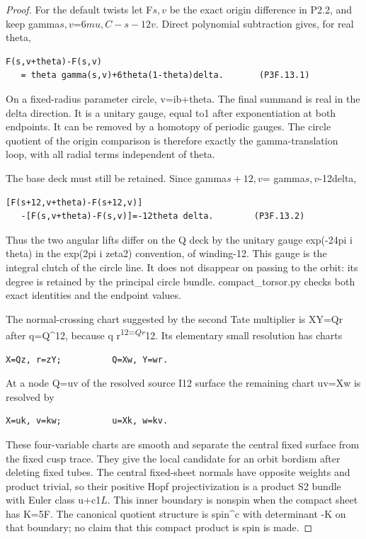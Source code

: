 \begin{proof}
For the default twists let F\(s,v\) be the exact origin difference in P2.2, and keep gamma\(s,v\)=\(6mu,C-s-12v\). Direct polynomial subtraction gives, for real theta,

\begin{lstlisting}
F(s,v+theta)-F(s,v)
   = theta gamma(s,v)+6theta(1-theta)delta.       (P3F.13.1)
\end{lstlisting}

On a fixed-radius parameter circle, v=ib+theta. The final summand is real in the delta direction. It is a unitary gauge, equal to1 after exponentiation at both endpoints. It can be removed by a homotopy of periodic gauges. The circle quotient of the origin comparison is therefore exactly the gamma-translation loop, with all radial terms independent of theta.

The base deck must still be retained. Since gamma\(s+12,v\)= gamma\(s,v\)-12delta,

\begin{lstlisting}
[F(s+12,v+theta)-F(s+12,v)]
   -[F(s,v+theta)-F(s,v)]=-12theta delta.        (P3F.13.2)
\end{lstlisting}

Thus the two angular lifts differ on the Q deck by the unitary gauge exp(-24pi i theta) in the exp(2pi i zeta2) convention, of winding-12. This gauge is the integral clutch of the circle line. It does not disappear on passing to the orbit: its degree is retained by the principal circle bundle. compact\_torsor.py checks both exact identities and the endpoint values.

The normal-crossing chart suggested by the second Tate multiplier is XY=Qr after q=Q\^{}12, because q r\textsuperscript{12=\(Qr\)}12. Its elementary small resolution has charts

\begin{lstlisting}
X=Qz, r=zY;          Q=Xw, Y=wr.
\end{lstlisting}

At a node Q=uv of the resolved source I12 surface the remaining chart uv=Xw is resolved by

\begin{lstlisting}
X=uk, v=kw;          u=Xk, w=kv.
\end{lstlisting}

These four-variable charts are smooth and separate the central fixed surface from the fixed cusp trace. They give the local candidate for an orbit bordism after deleting fixed tubes. The central fixed-sheet normals have opposite weights and product trivial, so their positive Hopf projectivization is a product S2 bundle with Euler class u+c1\(L\). This inner boundary is nonspin when the compact sheet has K=5F. The canonical quotient structure is spin\^{}c with determinant -K on that boundary; no claim that this compact product is spin is made.


\end{proof}
